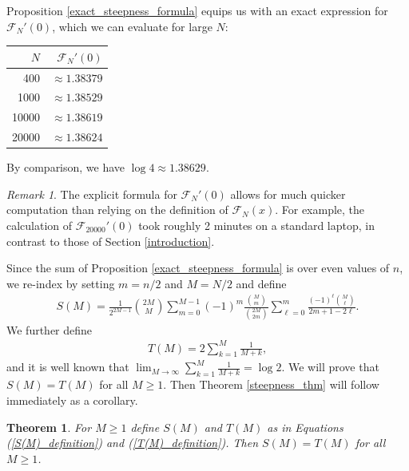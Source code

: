 \documentclass{amsart}
\theoremstyle{plain}
\newtheorem{thm}[equation]{Theorem}
\theoremstyle{remark}
\newtheorem{rmk}[equation]{Remark}
\begin{document}
Proposition \ref{exact_steepness_formula} equips us with an exact expression for $\mathcal{F}_N'(0)$, which we can evaluate for large $N$:
\begin{center}
\begin{tabular}{rr}
$N$ & $\mathcal{F}_N'(0)$ \\
\hline
400 & $\approx     1.38379$ \\
1000 & $\approx   1.38529$ \\
10000 & $\approx 1.38619$\\
20000 & $\approx 1.38624$
\end{tabular}
\end{center}
By comparison, we have $\log 4 \approx 1.38629$. 

\begin{rmk}
The explicit formula for $\mathcal{F}_N'(0)$ allows for much quicker computation than relying on the definition of $\mathcal{F}_N(x)$.  For example, the calculation of $\mathcal{F}_{20000}'(0)$ took roughly 2 minutes on a standard laptop, in contrast to those of Section \ref{introduction}.
\end{rmk}

Since the sum of Proposition \ref{exact_steepness_formula} is over even values of $n$, we re-index by setting $m = n/2$ and $M = N/2$ and define
\begin{align} \label{S(M)_definition}
S(M) = \frac{1}{2^{2M-1}}\binom{2M}{M} \sum_{m=0}^{M-1} (-1)^m \frac{\binom{M}{m}}{\binom{2M}{2m}} \sum_{\ell = 0}^{m} \frac{(-1)^{\ell}\binom{M}{\ell}}{2m+1-2\ell}.
\end{align}
We further define 
\begin{align} \label{T(M)_definition}
T(M) = 2 \sum_{k=1}^{M} \frac{1}{M+k},
\end{align}
and it is well known that $\lim_{M \to \infty} \sum_{k=1}^{M} \frac{1}{M+k} = \log 2$. We will prove that $S(M) = T(M)$ for all $M \geq 1$.  Then Theorem \ref{steepness_thm} will follow immediately as a corollary.

\begin{thm} \label{induction_theorem}
For $M \geq 1$ define $S(M)$ and $T(M)$ as in Equations (\ref{S(M)_definition}) and (\ref{T(M)_definition}).  Then $S(M) = T(M)$ for all $M \geq 1$.
\end{thm}
\end{document}
